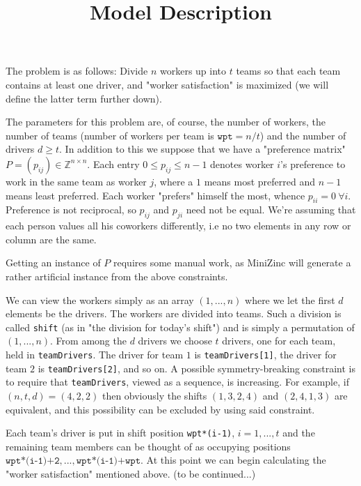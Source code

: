 \documentclass[a4paper,11pt]{article}
\title{Model Description}
\begin{document}
\maketitle

\noindent
The problem is as follows: Divide $n$ workers up into $t$ teams so that each team contains at least one driver, and "worker satisfaction" is maximized (we will define the latter term further down).

The parameters for this problem are, of course, the number of workers, the number of teams (number of workers per team is $\texttt{wpt}=n/t$) and the number of drivers $d\geq t$. In addition to this we suppose that we have a "preference matrix" $P=(p_{ij}) \in \mathbb{Z}^{n\times n}$. Each entry $0\leq p_{ij}\leq n-1$ denotes worker $i$'s preference to work in the same team as worker $j$, where a $1$ means most preferred and $n-1$ means least preferred. Each worker "prefers" himself the most, whence $p_{ii}=0\ \forall i$. Preference is not reciprocal, so $p_{ij}$ and $p_{ji}$ need not be equal. We're assuming that each person values all his coworkers differently, i.e no two elements in any row or column are the same.

Getting an instance of $P$ requires some manual work, as MiniZinc will generate a rather artificial instance from the above constraints.

We can view the workers simply as an array $(1,...,n)$ where we let the first $d$ elements be the drivers. The workers are divided into teams. Such a division is called \texttt{shift} (as in "the division for today's shift") and is simply a permutation of $(1,...,n)$. From among the $d$ drivers we choose $t$ drivers, one for each team, held in \texttt{teamDrivers}. The driver for team $1$ is \texttt{teamDrivers[1]}, the driver for team $2$ is \texttt{teamDrivers[2]}, and so on. A possible symmetry-breaking constraint is to require that \texttt{teamDrivers}, viewed as a sequence, is increasing. For example, if $(n,t,d)=(4,2,2)$ then obviously the shifts $(1,3,2,4)$ and $(2,4,1,3)$ are equivalent, and this possibility can be excluded by using said constraint.

Each team's driver is put in shift position \texttt{wpt*(i-1)}, $i=1,...,t$ and the remaining team members can be thought of as occupying positions $\texttt{wpt*(i-1)+2},...,\texttt{wpt*(i-1)+wpt}$.\newline
\newline
\noindent
At this point we can begin calculating the "worker satisfaction" mentioned above. (to be continued...)
\end{document}
